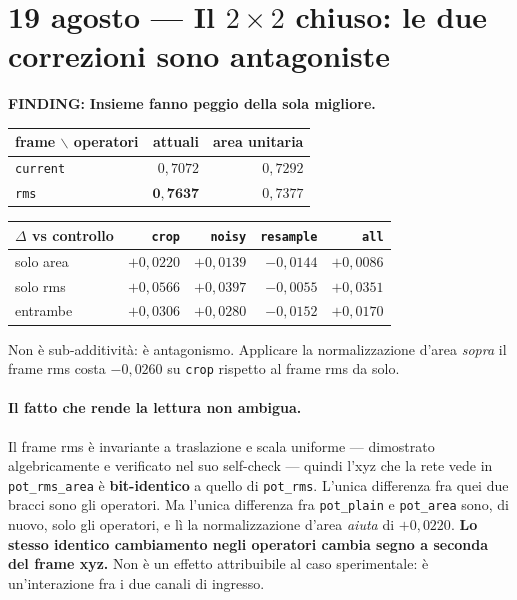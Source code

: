 \documentclass[11pt,a4paper]{article}
\newcommand{\finding}[1]{\textcolor{finding}{\textbf{FINDING:}} #1}
\begin{document}
\section{19 agosto --- Il $2\times2$ chiuso: le due correzioni sono antagoniste}

\finding{\textbf{Insieme fanno peggio della sola migliore.}}

\begin{center}\small
\begin{tabular}{lrr}
\toprule
frame $\backslash$ operatori & attuali & area unitaria \\
\midrule
\texttt{current} & $0{,}7072$ & $0{,}7292$ \\
\texttt{rms}     & $\mathbf{0{,}7637}$ & $0{,}7377$ \\
\bottomrule
\end{tabular}
\qquad
\begin{tabular}{lrrrr}
\toprule
$\Delta$ vs controllo & \texttt{crop} & \texttt{noisy} & \texttt{resample} & \texttt{all} \\
\midrule
solo area & $+0{,}0220$ & $+0{,}0139$ & $-0{,}0144$ & $+0{,}0086$ \\
solo rms  & $+0{,}0566$ & $+0{,}0397$ & $-0{,}0055$ & $+0{,}0351$ \\
entrambe  & $+0{,}0306$ & $+0{,}0280$ & $-0{,}0152$ & $+0{,}0170$ \\
\bottomrule
\end{tabular}
\end{center}

Non \`e sub-additivit\`a: \`e antagonismo. Applicare la normalizzazione d'area \emph{sopra} il
frame rms costa $-0{,}0260$ su \texttt{crop} rispetto al frame rms da solo.

\paragraph{Il fatto che rende la lettura non ambigua.} Il frame rms \`e invariante a traslazione
e scala uniforme --- dimostrato algebricamente e verificato nel suo self-check --- quindi l'xyz
che la rete vede in \texttt{pot\_rms\_area} \`e \textbf{bit-identico} a quello di
\texttt{pot\_rms}. L'unica differenza fra quei due bracci sono gli operatori. Ma l'unica
differenza fra \texttt{pot\_plain} e \texttt{pot\_area} sono, di nuovo, solo gli operatori, e l\`i
la normalizzazione d'area \emph{aiuta} di $+0{,}0220$. \textbf{Lo stesso identico cambiamento
negli operatori cambia segno a seconda del frame xyz.} Non \`e un effetto attribuibile al caso
sperimentale: \`e un'interazione fra i due canali di ingresso.
\end{document}
